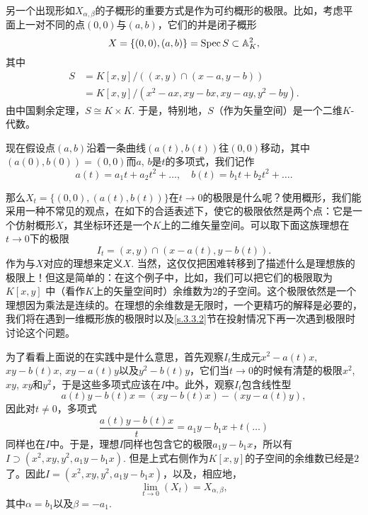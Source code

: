 另一个出现形如$X_{\alpha,\beta}$的子概形的重要方式是作为可约概形的极限。比如，考虑平面上一对不同的点$(0,0)$与$(a,b)$，它们的并是闭子概形
\[
	X=\{(0,0),(a,b)\}=\operatorname{Spec} S\subset \mathbb{A}_K^2,
\]
其中
\[
\begin{aligned}
	S&=K[x,y]/\left((x,y)\cap (x-a,y-b)\right)\\
	&=K[x,y]/(x^2-ax,xy-bx,xy-ay,y^2-by).
\end{aligned}
\]
由中国剩余定理，$S\cong K\times K$. 于是，特别地，$S$（作为矢量空间）是一个二维$K$\hyp 代数。

现在假设点$(a,b)$沿着一条曲线$(a(t),b(t))$往$(0,0)$移动，其中$(a(0),b(0))=(0,0)$而$a$, $b$是$t$的多项式，我们记作
\[
	a(t)=a_1t+a_2t^2+\dots,\quad b(t)=b_1t+b_2t^2+\dots.
\]


那么$X_t=\{(0,0),(a(t),b(t))\}$在$t\to 0$的极限是什么呢？使用概形，我们能采用一种不常见的观点，在如下的合适表述下，使它的极限依然是两个点：它是一个仿射概形$X$，其坐标环还是一个$K$上的二维矢量空间。可以取下面这族理想在$t\to 0$下的极限
\[
	I_t=(x,y)\cap (x-a(t),y-b(t)).
\]
作为与$X$对应的理想来定义$X$. 当然，这仅仅把困难转移到了描述什么是理想族的极限上！但这是简单的：在这个例子中，比如，我们可以把它们的极限取为$K[x,y]$
中（看作$K$上的矢量空间时）余维数为$2$的子空间。这个极限依然是一个理想因为乘法是连续的。在理想的余维数是无限时，一个更精巧的解释是必要的，我们将在遇到一维概形族的极限时以及\ref{s.3.3.2}节在投射情况下再一次遇到极限时讨论这个问题。

为了看看上面说的在实践中是什么意思，首先观察$I_t$生成元$x^2-a(t)x$, $xy-b(t)x$, $xy-a(t)y$以及$y^2-b(t)y$，它们当$t\to 0$的时候有清楚的极限$x^2$, $xy$, $xy$和$y^2$，于是这些多项式应该在$I$中。此外，观察$I_t$包含线性型\\\vspace{-3em}
\[
	a(t)y-b(t)x=(xy-b(t)x)-(xy-a(t)y),
\]
因此对$t\neq 0$，多项式
\[
	\frac{a(t)y-b(t)x}{t}=a_1y-b_1x+t(\dots)
\]
同样也在$I$中。于是，理想$I$同样也包含它的极限$a_1y-b_1x$，所以有$I\supset (x^2,xy,y^2,a_1y-b_1x)$. 但是上式右侧作为$K[x,y]$的子空间的余维数已经是$2$了。因此$I=(x^2,xy,y^2,a_1y-b_1x)$，以及，相应地，
\[
	\lim_{t\to 0}(X_t)=X_{\alpha,\beta},
\]
其中$\alpha=b_1$以及$\beta=-a_1$.


